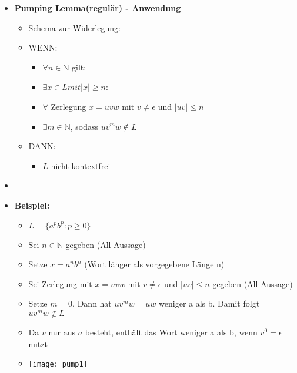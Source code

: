 \begin{itemize}
\item {\large \textbf{Pumping Lemma(regulär) - Anwendung}}
	\begin{itemize}
	\item Schema zur Widerlegung:
	\item WENN: 
		\begin{itemize}
		\item $\forall n \in \mathbb{N}$ gilt:
		\item $\exists x \in L mit |x| \geq n$:
		\item $\forall$ Zerlegung $x=uvw$ mit $v \neq \epsilon$ und $|uv| \leq n$
		\item $\exists m \in \mathbb{N}$, sodass $uv^mw \notin L$
		\end{itemize}
	\item DANN: 
		\begin{itemize}
		\item $L$ nicht kontextfrei
		\end{itemize}
	\end{itemize}
	\item[]
	\item \textbf{Beispiel:}
		\begin{itemize}
		\item $L=\{a^pb^p : p \geq 0 \}$
		\item Sei $n \in \mathbb{N}$ gegeben (All-Aussage)
		\item Setze $x = a^nb^n$ (Wort länger als vorgegebene Länge n)
		\item Sei Zerlegung mit $x=uvw$ mit $v \neq \epsilon$ und $|uv| \leq n$ gegeben (All-Aussage)
		\item Setze $m = 0$. Dann hat $uv^mw = uw$ weniger a als b. Damit folgt $uv^mw \notin L$ 
		\item Da $v$ nur aus $a$ besteht, enthält das Wort weniger a als b, wenn $v^0 = \epsilon$ nutzt
		\item[]
			\begin{center}
			\texttt{[image: pump1]}
			\end{center}
		\end{itemize}	



\end{itemize}
